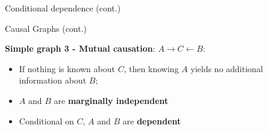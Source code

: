 \documentclass[compress, 8pt]{beamer}
\begin{document}
\begin{frame}{Conditional dependence (cont.)}






\end{frame}


\begin{frame}{Causal Graphs (cont.)}


\textbf{Simple graph 3 - Mutual causation}: $A \rightarrow C \leftarrow B$:
\begin{figure}
\end{figure}
\begin{itemize}
    \item If nothing is known about $C$, then knowing $A$ yields no additional information about $B$; 
    \item $A$ and $B$ are \textbf{marginally independent}
    \item Conditional on $C$, $A$ and $B$ are \textbf{dependent}
\end{itemize}

\end{frame}








\end{document}
